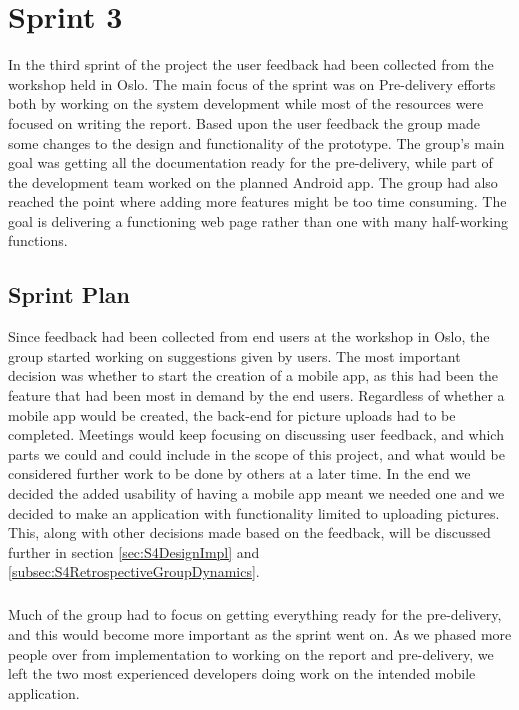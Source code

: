 \chapter{Sprint 3}
\label{chap:S4}

In the third sprint of the project the user feedback had been collected from the workshop held in Oslo. The main focus of the sprint was on Pre-delivery efforts both by working on the system development while most of the resources were focused on writing the report. Based upon the user feedback the group made some changes to the design and functionality of the prototype. The group's main goal was getting all the documentation ready for the pre-delivery, while part of the development team worked on the planned Android app. The group had also reached the point where adding more features might be too time consuming. The goal is delivering a functioning web page rather than one with many half-working functions.

\section{Sprint Plan}
\label{sec:S4Plan}

Since feedback had been collected from end users at the workshop in Oslo, the group started working on suggestions given by users. The most important decision was whether to start the creation of a mobile app, as this had been the feature that had been most in demand by the end users. Regardless of whether a mobile app would be created, the back-end for picture uploads had to be completed. Meetings would keep focusing on discussing user feedback, and which parts we could and could include in the scope of this project, and what would be considered further work to be done by others at a later time. In the end we decided the added usability of having a mobile app meant we needed one and we decided to make an application with functionality limited to uploading pictures. This, along with other decisions made based on the feedback, will be discussed further in section \ref{sec:S4DesignImpl} and \ref{subsec:S4RetrospectiveGroupDynamics}.

\paragraph{} Much of the group had to focus on getting everything ready for the pre-delivery, and this would become more important as the sprint went on. As we phased more people over from implementation to working on the report and pre-delivery, we left the two most experienced developers doing work on the intended mobile application.

